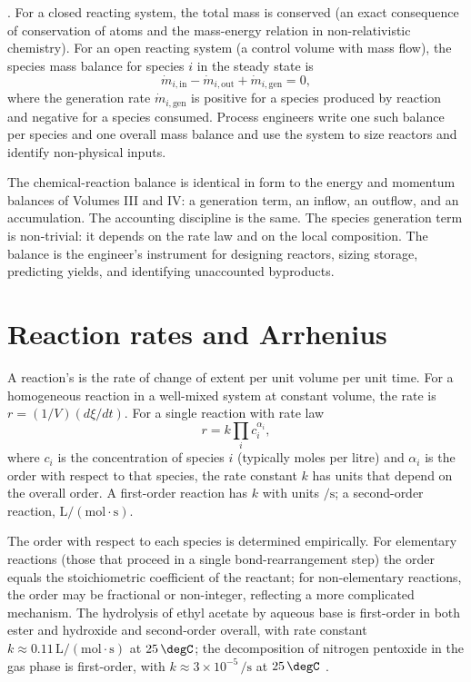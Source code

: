 . For a closed reacting system, the total mass
is conserved (an exact consequence of conservation of atoms and the
mass-energy relation in non-relativistic chemistry). For an open
reacting system (a control volume with mass flow), the species mass
balance for species $i$ in the steady state is
\[
\dot{m}_{i,\text{in}} - \dot{m}_{i,\text{out}} + \dot{m}_{i,\text{gen}} = 0,
\]
where the generation rate $\dot{m}_{i,\text{gen}}$ is positive for a
species produced by reaction and negative for a species consumed.
Process engineers write one such balance per species and one overall
mass balance and use the system to size reactors and identify
non-physical inputs.

\begin{archetype}[Balance]
The chemical-reaction balance is identical in form to the energy and
momentum balances of Volumes III and IV: a generation term, an inflow,
an outflow, and an accumulation. The accounting discipline is the
same. The species generation term is non-trivial: it depends on the
rate law and on the local composition. The balance is the engineer's
instrument for designing reactors, sizing storage, predicting yields,
and identifying unaccounted byproducts.
\end{archetype}

\section{Reaction rates and Arrhenius}

A reaction's  is the rate of change of extent per unit
volume per unit time. For a homogeneous reaction in a well-mixed
system at constant volume, the rate is $r = (1/V)(d\xi/dt)$. For a
single reaction with rate law
\[
r = k \prod_i c_i^{\alpha_i},
\]
where $c_i$ is the concentration of species $i$ (typically moles per
litre) and $\alpha_i$ is the order with respect to that species, the
rate constant $k$ has units that depend on the overall order. A
first-order reaction has $k$ with units $\si{\per\second}$; a
second-order reaction, $\text{L}/(\text{mol}\cdot\si{\second})$.

The order with respect to each species is determined empirically. For
elementary reactions (those that proceed in a single bond-rearrangement
step) the order equals the stoichiometric coefficient of the reactant;
for non-elementary reactions, the order may be fractional or
non-integer, reflecting a more complicated mechanism. The hydrolysis
of ethyl acetate by aqueous base is first-order in both ester and
hydroxide and second-order overall, with rate constant $k \approx
0.11\,\text{L}/(\text{mol}\cdot\si{\second})$ at $25\,\degC$; the
decomposition of nitrogen pentoxide in the gas phase is first-order,
with $k \approx 3 \times 10^{-5}\,\si{\per\second}$ at $25\,\degC$
\cite[ch.~17]{text:atkins-physical-chemistry}.

